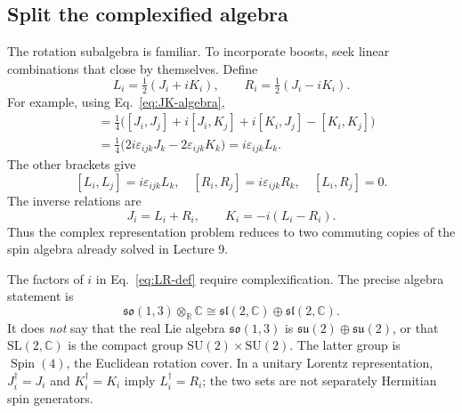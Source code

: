 \documentclass[11pt]{article}
\newcommand{\R}{\mathbb{R}}
\newcommand{\C}{\mathbb C}
\newcommand{\SU}{\mathrm{SU}}
\newcommand{\SL}{\mathrm{SL}}
\newcommand{\su}{\mathfrak{su}}
\newcommand{\so}{\mathfrak{so}}
\newcommand{\slie}{\mathfrak{sl}}
\newcommand{\Spin}{\operatorname{Spin}}
\newcommand{\eps}{\varepsilon}
\begin{document}
\subsection{Split the complexified algebra}
The rotation subalgebra is familiar. To incorporate boosts, seek linear
combinations that close by themselves. Define
\begin{equation}
 L_i=\tfrac12(J_i+iK_i),\qquad R_i=\tfrac12(J_i-iK_i).
 \label{eq:LR-def}
\end{equation}
For example, using Eq.~\eqref{eq:JK-algebra},
\begin{align*}
 [L_i,L_j]
 &=\tfrac14\bigl([J_i,J_j]+i[J_i,K_j]+i[K_i,J_j]-[K_i,K_j]\bigr)\\
 &=\tfrac14\bigl(2i\eps_{ijk}J_k-2\eps_{ijk}K_k\bigr)
 =i\eps_{ijk}L_k.
\end{align*}
The other brackets give
\begin{equation}
 \boxed{[L_i,L_j]=i\eps_{ijk}L_k,\quad
 [R_i,R_j]=i\eps_{ijk}R_k,\quad [L_i,R_j]=0.}
 \label{eq:LR-algebra}
\end{equation}
The inverse relations are
\begin{equation}
 J_i=L_i+R_i,\qquad K_i=-i(L_i-R_i).
 \label{eq:JK-inverse}
\end{equation}
Thus the complex representation problem reduces to two commuting copies
of the spin algebra already solved in Lecture 9.

\begin{warningbox}
The factors of \(i\) in Eq.~\eqref{eq:LR-def} require complexification.
The precise algebra statement is
\[
 \so(1,3)\otimes_{\R}\C
 \cong\slie(2,\C)\oplus\slie(2,\C).
\]
It does \emph{not} say that the real Lie algebra \(\so(1,3)\) is
\(\su(2)\oplus\su(2)\), or that \(\SL(2,\C)\) is the compact group
\(\SU(2)\times\SU(2)\). The latter group is \(\Spin(4)\), the Euclidean
rotation cover. In a unitary Lorentz representation,
\(J_i^\dagger=J_i\) and \(K_i^\dagger=K_i\) imply \(L_i^\dagger=R_i\);
the two sets are not separately Hermitian spin generators.
\end{warningbox}
\end{document}
